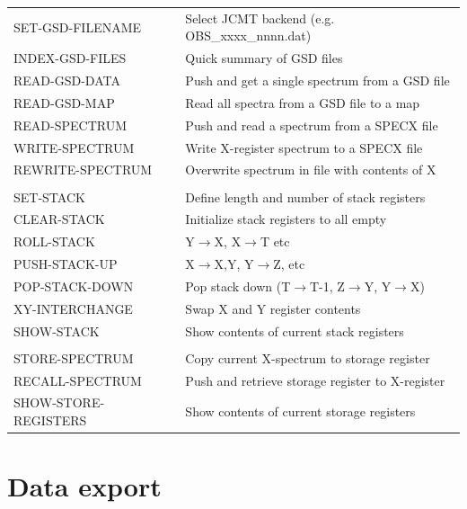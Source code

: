 \documentclass[11pt,twoside]{report}
\begin{document}
\begin{tabular}{ll}
SET-GSD-FILENAME       & Select JCMT backend (e.g. OBS\_xxxx\_nnnn.dat)\\
INDEX-GSD-FILES        & Quick summary of GSD files \\
READ-GSD-DATA          & Push and get a single spectrum from a GSD file\\
READ-GSD-MAP           & Read all spectra from a GSD file to a map\\
READ-SPECTRUM          & Push and read a spectrum from a SPECX file \\
WRITE-SPECTRUM         & Write X-register spectrum to a SPECX file\\
REWRITE-SPECTRUM       & Overwrite spectrum in file with contents of X\\
\\
SET-STACK              & Define length and number of stack registers\\
CLEAR-STACK            & Initialize stack registers to all empty\\
ROLL-STACK             & Y$\rightarrow$X, X$\rightarrow$T etc\\
PUSH-STACK-UP          & X$\rightarrow$X,Y, Y$\rightarrow$Z, etc\\
POP-STACK-DOWN         & \parbox[t]{4.5in}{
                         Pop stack down (T$\rightarrow$T-1, Z$\rightarrow$Y, 
                         Y$\rightarrow$X)}\\
XY-INTERCHANGE         & Swap X and Y register contents\\
SHOW-STACK             & Show contents of current stack registers\\
\\
STORE-SPECTRUM         & Copy current X-spectrum to storage register\\
RECALL-SPECTRUM        & Push and retrieve storage register to X-register\\
SHOW-STORE-REGISTERS   & Show contents of current storage registers\\
\end{tabular}

\section{Data export}
\end{document}

